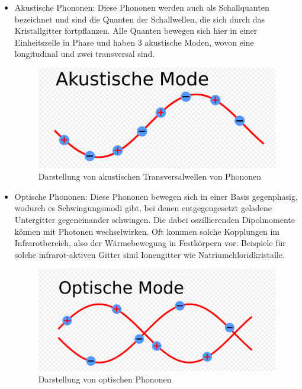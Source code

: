\begin{itemize}
    \item Akustische Phononen: Diese Phononen werden auch als Schallquanten bezeichnet und sind die Quanten der Schallwellen, die sich durch das Kristallgitter fortpflanzen.
          Alle Quanten bewegen sich hier in einer Einheitszelle in Phase und haben 3 akustische Moden, wovon eine longitudinal und zwei transversal sind.

          \begin{figure}[H]
            \centering
            \begin{samepage}
                \includegraphics[width=0.8\linewidth]{resources/09-05-2012/akust.PNG}
                \caption[Akustische Transversalwellen Phononen]{Darstellung von akustischen Transversalwellen von Phononen}
                \label{fig:akustische_transversalwellen_phononen}
            \end{samepage}
          \end{figure}

    \item Optische Phononen: Diese Phononen bewegen sich in einer Basis gegenphasig, wodurch es Schwingungsmodi gibt, bei denen entgegengesetzt geladene Untergitter gegeneinander schwingen. 
          Die dabei oszillierenden Dipolmomente können mit Photonen wechselwirken. Oft kommen solche Kopplungen im Infrarotbereich, also der Wärmebewegung in Festkörpern vor.
          Beispiele für solche infrarot-aktiven Gitter sind Ionengitter wie Natriumchloridkristalle.

         \begin{figure}[H]
             \centering
             \begin{samepage}
                 \includegraphics[width=0.8\linewidth]{resources/09-05-2012/opt.PNG}
                 \caption[Optische Wellen Phononen]{Darstellung von optischen Phononen}
                 \label{fig:optische_wellen_phononen}
             \end{samepage}
         \end{figure}

\end{itemize}



